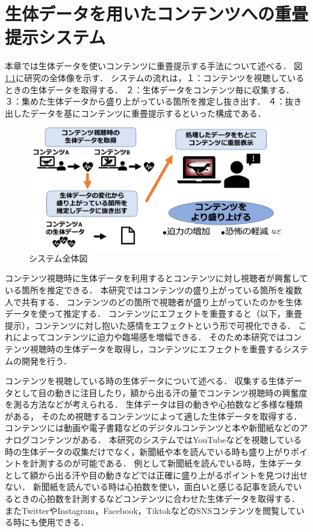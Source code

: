 \chapter{生体データを用いたコンテンツへの重畳提示システム}

\thispagestyle{myheadings}

本章では生体データを使いコンテンツに重畳提示する手法について述べる．
図\ref{systemall}に研究の全体像を示す．
システムの流れは，１：コンテンツを視聴しているときの生体データを取得する．
２：生体データをコンテンツ毎に収集する．
３：集めた生体データから盛り上がっている箇所を推定し抜き出す．
４：抜き出したデータを基にコンテンツに重畳提示するといった構成である．

\begin{figure}[H]
    \centering
    \includegraphics[width=15cm]{images/chapter3/allsysytem.png}
    \caption{システム全体図}
    \label{systemall}
\end{figure}



コンテンツ視聴時に生体データを利用するとコンテンツに対し視聴者が興奮している箇所を推定できる．
本研究ではコンテンツの盛り上がっている箇所を複数人で共有する．
コンテンツのどの箇所で視聴者が盛り上がっていたのかを生体データを使って推定する．
コンテンツにエフェクトを重畳すると（以下，重畳提示），コンテンツに対し抱いた感情をエフェクトという形で可視化できる．
これによってコンテンツに迫力や臨場感を増幅できる．
そのため本研究ではコンテンツ視聴時の生体データを取得し，コンテンツにエフェクトを重畳するシステムの開発を行う．

コンテンツを視聴している時の生体データについて述べる．
収集する生体データとして目の動きに注目したり，額から出る汗の量でコンテンツ視聴時の興奮度を測る方法などが考えられる．
生体データは目の動きや心拍数など多様な種類がある，
そのため視聴するコンテンツによって適した生体データを取得する．
コンテンツには動画や電子書籍などのデジタルコンテンツと本や新聞紙などのアナログコンテンツがある．
本研究のシステムではYouTubeなどを視聴している時の生体データの収集だけでなく，新聞紙や本を読んでいる時も盛り上がりポイントを計測するのが可能である．
例として新聞紙を読んでいる時，生体データとして額から出る汗や目の動きなどでは正確に盛り上がるポイントを見つけ出せない．
新聞紙を読んでいる時は心拍数を使い，面白いと感じる記事を読んでいるときの心拍数を計測するなどコンテンツに合わせた生体データを取得する．
またTwitterやInstagram，Facebook，TiktokなどのSNSコンテンツを閲覧している時にも使用できる．

